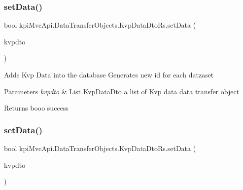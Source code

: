 \subsubsection{\texorpdfstring{set\+Data()}{setData()}\hspace{0.1cm}{\footnotesize\ttfamily [1/2]}}
{\footnotesize\ttfamily bool kpi\+Mvc\+Api.\+Data\+Transfer\+Objects.\+Kvp\+Data\+Dto\+Rs.\+set\+Data (\begin{DoxyParamCaption}\item[{List$<$ \hyperlink{classkpi_mvc_api_1_1_data_transfer_objects_1_1_kvp_data_dto}{Kvp\+Data\+Dto} $>$}]{kvpdto }\end{DoxyParamCaption})\hspace{0.3cm}{\ttfamily [inline]}}



Adds Kvp Data into the database Generates new id for each datzaset 


\begin{DoxyParams}{Parameters}
{\em kvpdto} & {\ttfamily  List \hyperlink{classkpi_mvc_api_1_1_data_transfer_objects_1_1_kvp_data_dto}{Kvp\+Data\+Dto} } a list of Kvp data data transfer object \\
\hline
\end{DoxyParams}
\begin{DoxyReturn}{Returns}
{\ttfamily booo} success
\end{DoxyReturn}
\mbox{\label{classkpi_mvc_api_1_1_data_transfer_objects_1_1_kvp_data_dto_rs_aab05e9ab80b2e766a6744a200e4d8e91}} 
\subsubsection{\texorpdfstring{set\+Data()}{setData()}\hspace{0.1cm}{\footnotesize\ttfamily [2/2]}}
{\footnotesize\ttfamily bool kpi\+Mvc\+Api.\+Data\+Transfer\+Objects.\+Kvp\+Data\+Dto\+Rs.\+set\+Data (\begin{DoxyParamCaption}\item[{List$<$ \hyperlink{classkpi_mvc_api_1_1_data_transfer_objects_1_1_kvp_data_dto}{Kvp\+Data\+Dto} $>$}]{kvpdto }\end{DoxyParamCaption})\hspace{0.3cm}{\ttfamily [inline]}}



